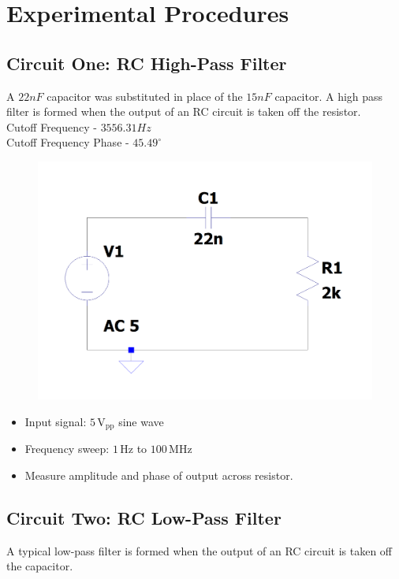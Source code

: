 \documentclass[12pt]{article}
\begin{document}
\section{Experimental Procedures}
\subsection{Circuit One: RC High-Pass Filter}
A $22nF$ capacitor was substituted in place of the $15nF$ capacitor.
A high pass filter is formed when the output of an RC circuit is taken off the
resistor. \\

Cutoff Frequency - $3556.31Hz$\\
Cutoff Frequency Phase - $45.49^\circ$\\
\begin{figure}[H]
	\includegraphics[width=\textwidth]{e6_01}
\end{figure}

\begin{itemize}
	\item Input signal: $5\,\mathrm{V_{pp}}$ sine wave
	\item Frequency sweep: $1\,\mathrm{Hz}$ to $100\,\mathrm{MHz}$
	\item Measure amplitude and phase of output across resistor.
\end{itemize}

\subsection{Circuit Two: RC Low-Pass Filter}
A typical low-pass filter is formed when the output of an RC circuit is taken
off the capacitor.\\
\end{document}
